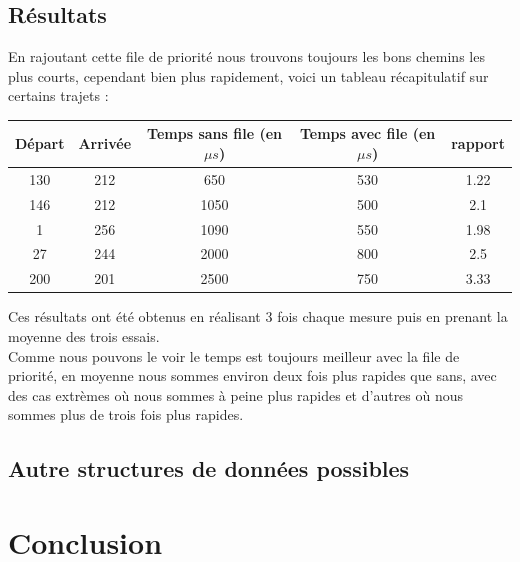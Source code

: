 \documentclass{article}
\begin{document}
\subsection{Résultats}

En rajoutant cette file de priorité nous trouvons toujours les bons chemins les plus courts, cependant
bien plus rapidement, voici un tableau récapitulatif sur certains trajets :\\

\begin{center}
\begin{tabular}{| c | c | c | c | c |}
	\hline
	 Départ & Arrivée & Temps sans file (en $\mu s$)& Temps avec file (en $\mu s$) & rapport \\ \hline
	 130 & 212 & 650 & 530 & 1.22 \\ \hline
	 146 & 212 & 1050 & 500 & 2.1 \\ \hline
	 1 & 256 & 1090 & 550 & 1.98\\ \hline
	 27 & 244 & 2000 & 800 & 2.5\\ \hline
	 200 & 201 & 2500 & 750 & 3.33 \\ \hline
\end{tabular}
\end{center}

Ces résultats ont été obtenus en réalisant 3 fois chaque mesure puis en prenant la moyenne des
trois essais.\\

Comme nous pouvons le voir le temps est toujours meilleur avec la file de priorité, en moyenne nous
sommes environ deux fois plus rapides que sans, avec des cas extrèmes où nous sommes à peine plus
rapides et d'autres où nous sommes plus de trois fois plus rapides.\\



\subsection{Autre structures de données possibles}


\section{Conclusion}
\end{document}
